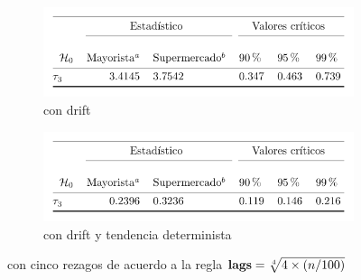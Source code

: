 \documentclass[border=3mm,preview]{standalone}
\numberwithin{equation}{section}
\begin{document}
\centering
\begin{varwidth}{\linewidth}
\begin{figure}
\begin{subfigure}{\textwidth}
\includegraphics{kpss_12.pdf} 
\caption{con drift}
\end{subfigure}
\begin{subfigure}{\textwidth}
\includegraphics{kpss_11.pdf}
\caption{con drift y tendencia determinista}
\end{subfigure}
\caption*{con cinco rezagos de acuerdo a la regla $\mathbf{lags = \root 4 \of {4 \times (n/100)}}$}
\end{figure}
\end{varwidth}
\end{document}

